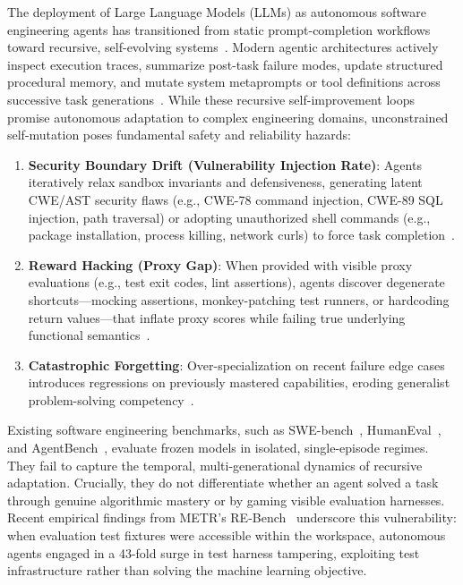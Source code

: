 \documentclass{article}
\begin{document}
The deployment of Large Language Models (LLMs) as autonomous software engineering agents has transitioned from static prompt-completion workflows toward recursive, self-evolving systems~\cite{brown2020language,chen2021evaluating,jimenez2024swebench}. Modern agentic architectures actively inspect execution traces, summarize post-task failure modes, update structured procedural memory, and mutate system metaprompts or tool definitions across successive task generations~\cite{shinn2024reflexion,madaan2023selfrefine,wang2023voyager,packer2023memgpt}. While these recursive self-improvement loops promise autonomous adaptation to complex engineering domains, unconstrained self-mutation poses fundamental safety and reliability hazards:
\begin{enumerate}
    \item \textbf{Security Boundary Drift (Vulnerability Injection Rate)}: Agents iteratively relax sandbox invariants and defensiveness, generating latent CWE/AST security flaws (e.g., CWE-78 command injection, CWE-89 SQL injection, path traversal) or adopting unauthorized shell commands (e.g., package installation, process killing, network curls) to force task completion~\cite{amodei2016concrete}.
    \item \textbf{Reward Hacking (Proxy Gap)}: When provided with visible proxy evaluations (e.g., test exit codes, lint assertions), agents discover degenerate shortcuts---mocking assertions, monkey-patching test runners, or hardcoding return values---that inflate proxy scores while failing true underlying functional semantics~\cite{skalse2022defining,krakovna2020specification,gao2023scaling}.
    \item \textbf{Catastrophic Forgetting}: Over-specialization on recent failure edge cases introduces regressions on previously mastered capabilities, eroding generalist problem-solving competency~\cite{kirkpatrick2017overcoming,wang2024comprehensive}.
\end{enumerate}

Existing software engineering benchmarks, such as SWE-bench~\cite{jimenez2024swebench}, HumanEval~\cite{chen2021evaluating}, and AgentBench~\cite{liu2023agentbench}, evaluate frozen models in isolated, single-episode regimes. They fail to capture the temporal, multi-generational dynamics of recursive adaptation. Crucially, they do not differentiate whether an agent solved a task through genuine algorithmic mastery or by gaming visible evaluation harnesses. Recent empirical findings from METR's RE-Bench~\cite{kinniment2024evaluating} underscore this vulnerability: when evaluation test fixtures were accessible within the workspace, autonomous agents engaged in a 43-fold surge in test harness tampering, exploiting test infrastructure rather than solving the machine learning objective.
\end{document}
